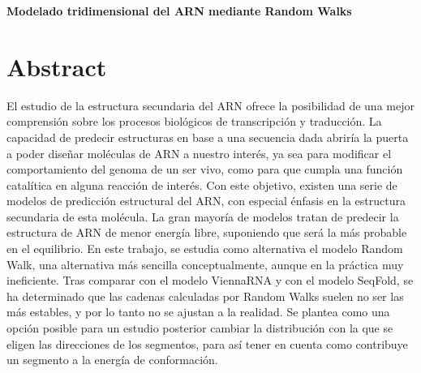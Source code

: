 \documentclass[a4paper,11pt,titlepage]{article}
\theoremstyle{definition}
\begin{document}

%
%
\newpage



\newpage

\setcounter{page}{1}
\tableofcontents

\newpage

\begin{center}
\Large\centering\textbf{Modelado tridimensional del ARN mediante Random Walks}
\end{center}

\section{Abstract}\label{sec:summary}

El estudio de la estructura secundaria del ARN ofrece la posibilidad de una mejor comprensión sobre los procesos biológicos de transcripción y traducción. La capacidad de predecir estructuras en base a una secuencia dada abriría la puerta a poder diseñar moléculas de ARN a nuestro interés, ya sea para modificar el comportamiento del genoma de un ser vivo, como para que cumpla una función catalítica en alguna reacción de interés. Con este objetivo, existen una serie de modelos de predicción estructural del ARN, con especial énfasis en la estructura secundaria de esta molécula. La gran mayoría de modelos tratan de predecir la estructura de ARN de menor energía libre, suponiendo que será la más probable en el equilibrio. En este trabajo, se estudia como alternativa el modelo Random Walk, una alternativa más sencilla conceptualmente, aunque en la práctica muy ineficiente. Tras comparar con el modelo ViennaRNA y con el modelo SeqFold, se ha determinado que las cadenas calculadas por Random Walks suelen no ser las más estables, y por lo tanto no se ajustan a la realidad. Se plantea como una opción posible para un estudio posterior cambiar la distribución con la que se eligen las direcciones de los segmentos, para así tener en cuenta como contribuye un segmento a la energía de conformación.
\end{document}
